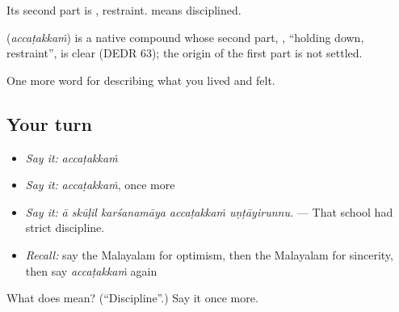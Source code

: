 Its second part is , restraint.  means disciplined.

\begin{cousinweb}
\textbf{} (\emph{accaṭakkaṁ}) is a native compound whose second part, , \textquotedblleft{}holding down, restraint\textquotedblright{}, is clear (DEDR 63); the origin of the first part is not settled.
\end{cousinweb}

\begin{grammarlens}[title={What you've built}]
One more word for describing what you lived and felt.
\end{grammarlens}

\subsection*{Your turn}
\begin{itemize}
\raggedright
  \item \emph{Say it:} \emph{accaṭakkaṁ}
  \item \emph{Say it:} \emph{accaṭakkaṁ}, once more
  \item \emph{Say it:} \emph{ā skūḷil karśanamāya accaṭakkaṁ uṇṭāyirunnu.} — That school had strict discipline.
  \item \emph{Recall:} say the Malayalam for optimism, then the Malayalam for sincerity, then say \emph{accaṭakkaṁ} again
\end{itemize}

\begin{tcolorbox}[breakable,colback=teal!4,colframe=teal!35!black,title={Before you move on}]
What does  mean? (\textquotedblleft{}Discipline\textquotedblright{}.) Say it once more.
\end{tcolorbox}
